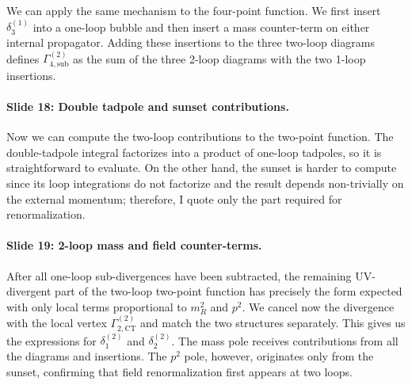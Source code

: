 \documentclass[11pt,a4paper]{article}
\begin{document}
We can apply the same mechanism to the four-point function. We first insert $\delta_3^{(1)}$ into a one-loop bubble and then insert a mass counter-term on either internal propagator. 
Adding these insertions to the three two-loop diagrams defines $\Gamma_{4,\mathrm{sub}}^{(2)}$ as the sum of the three 2-loop diagrams with the two 1-loop insertions. 

\paragraph{Slide 18: Double tadpole and sunset contributions.}

Now we can compute the two-loop contributions to the two-point function. The double-tadpole integral factorizes into a product of one-loop tadpoles, so it is straightforward to evaluate. On the other hand, the sunset is harder to compute since its loop integrations do not factorize and the result depends non-trivially on the external momentum; therefore, I quote only the part required for renormalization. 

\paragraph{Slide 19: 2-loop mass and field counter-terms.}

After all one-loop sub-divergences have been subtracted, the remaining UV-divergent part of the two-loop two-point function has precisely the form expected with only local terms proportional to $m_R^2$ and $p^2$. We cancel now the divergence with the local vertex $\Gamma^{(2)}_{2,\mathrm{CT}}$ and match the two structures separately. This gives us the expressions for $\delta_1^{(2)}$ and $\delta_2^{(2)}$. The mass pole receives contributions from all the diagrams and insertions. The $p^2$ pole, however, originates only from the sunset, confirming that field renormalization first appears at two loops.
\end{document}
